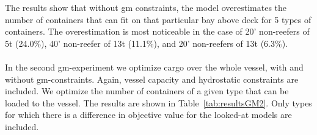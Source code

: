 The results show that without gm constraints, the model overestimates the number of containers that can fit on that particular bay above deck for 5 types of containers. The overestimation is most noticeable in the case of 20' non-reefers of 5t (24.0\%), 40' non-reefer of 13t (11.1\%), and 20' non-reefers of 13t (6.3\%).
\\\\
In the second gm-experiment we optimize cargo over the whole vessel, with and without gm-constraints. %
Again, vessel capacity and hydrostatic constraints are included. We optimize the number of containers of a given type that can be loaded to the vessel.
The results are shown in Table~\ref{tab:resultsGM2}. Only types for which there is a difference in objective value for the looked-at models are included.
